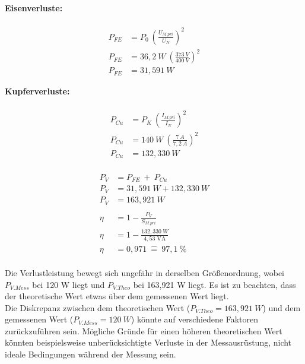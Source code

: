 \begin{enumerate}[label=\alph*)]
\begin{tcolorbox}[colback=gray!30,
			      colframe=black,
			      width=0.9\textwidth,
		      ]
{			      \begin{minipage}{0.5\textwidth}
				      \textbf{Eisenverluste:}\\ \ \\
				      \begin{align*}
					      P_{FE} & = P_0\ \left(\frac{U_{M.pri}}{U_N}\right)^2     \\
					      P_{FE} & = 36,2\ W\ \left(\frac{373\ V}{400\ V}\right)^2 \\
					      P_{FE} & = 31,591\ W
				      \end{align*}
			      \end{minipage}\hfill
			      \begin{minipage}{0.5\textwidth}
				      \textbf{Kupferverluste:}\\ \ \\
				      \begin{align*}
					      P_{Cu} & = P_K\ \left(\frac{I_{M.pri}}{I_N}\right)^2  \\
					      P_{Cu} & = 140\ W\ \left(\frac{7\ A}{7,2\ A}\right)^2 \\
					      P_{Cu} & = 132,330\ W
				      \end{align*}
			      \end{minipage}
		      }
	      \end{tcolorbox}
	      \begin{center}
		      \begin{minipage}[c]{0.5\linewidth}
			      \begin{align*}
				      \\
				      P_{V} & = P_{FE} \ +\ P_{Cu}                    \\
				      P_{V} & = 31,591\ W + 132,330\ W                \\
				      P_{V} & = 163,921\ W
				      \\
				      \\
				      \eta  & = 1-\frac{P_{V}}{S_{M.pri}}             \\
				      \eta  & = 1- \frac{132,330\ W }{4,53\text{ VA}} \\
				      \eta  & = 0,971\ \widehat{=}\ 97,1\ \%          \\
			      \end{align*}
		      \end{minipage}
	      \end{center}

	      Die Verlustleistung bewegt sich ungefähr in derselben Größenordnung, wobei
	      $P_{V.Mess}$ bei 120 W liegt und $P_{V.Theo}$ bei 163,921 W liegt. Es ist zu
	      beachten, dass der theoretische Wert etwas über dem gemessenen Wert liegt.\\
	      Die Diskrepanz zwischen dem theoretischen Wert ($P_{V.Theo} = 163,921\ W$) und
	      dem gemessenen Wert ($P_{V.Mess} = 120\ W$) könnte auf verschiedene Faktoren
	      zurückzuführen sein. Mögliche Gründe für einen höheren theoretischen Wert
	      könnten beispielsweise unberücksichtigte Verluste in der Messausrüstung, nicht
	      ideale Bedingungen während der Messung sein.


\end{enumerate}
